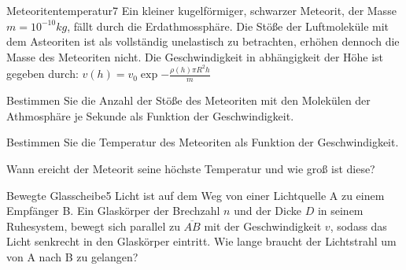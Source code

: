 \begin{problem}{Meteoritentemperatur}{7}
Ein kleiner kugelförmiger, schwarzer Meteorit, der Masse $m=10^{-10}\unit{kg}$, fällt durch die Erdathmossphäre. Die Stöße der Luftmoleküle mit dem Asteoriten ist als vollständig unelastisch zu betrachten, erhöhen dennoch die Masse des Meteoriten nicht. Die Geschwindigkeit in abhängigkeit der Höhe ist gegeben durch: $v(h)=v_0\exp{-\frac{\rho(h)\pi R^2h}{m}}$
 \begin{abcenum}
  \item Bestimmen Sie die Anzahl der Stöße des Meteoriten mit den Molekülen der Athmosphäre je Sekunde als Funktion der Geschwindigkeit.
  \item Bestimmen Sie die Temperatur des Meteoriten als Funktion der Geschwindigkeit.
  \item Wann ereicht der Meteorit seine höchste Temperatur und wie groß ist diese?
 \end{abcenum}
\end{problem}

\begin{problem}{Bewegte Glasscheibe}{5}
Licht ist auf dem Weg von einer Lichtquelle A zu einem Empfänger B. Ein Glaskörper der Brechzahl $n$ und der Dicke $D$ in seinem Ruhesystem, bewegt sich parallel zu $\overline{AB}$ mit der Geschwindigkeit $v$, sodass das Licht senkrecht in den Glaskörper eintritt. Wie lange braucht der Lichtstrahl um von A nach B zu gelangen?
\end{problem}

